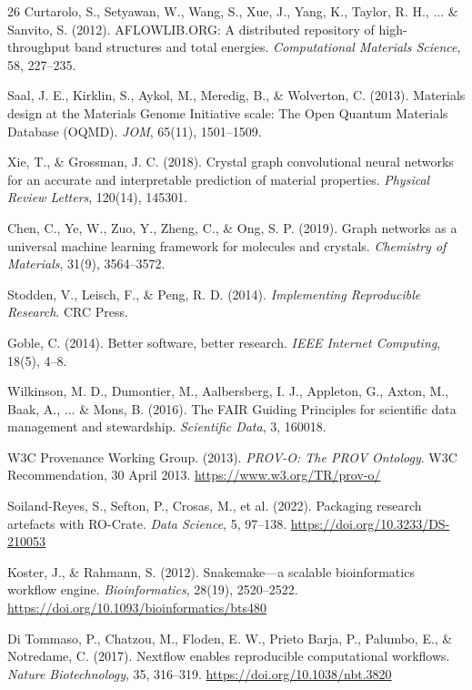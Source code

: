 \documentclass[11pt,a4paper,oneside]{report}
\begin{document}
\begin{thebibliography}{26}
Curtarolo, S., Setyawan, W., Wang, S., Xue, J., Yang, K., Taylor, R. H., ... \& Sanvito, S. (2012). AFLOWLIB.ORG: A distributed repository of high-throughput band structures and total energies. \emph{Computational Materials Science}, 58, 227--235.

Saal, J. E., Kirklin, S., Aykol, M., Meredig, B., \& Wolverton, C. (2013). Materials design at the Materials Genome Initiative scale: The Open Quantum Materials Database (OQMD). \emph{JOM}, 65(11), 1501--1509.

Xie, T., \& Grossman, J. C. (2018). Crystal graph convolutional neural networks for an accurate and interpretable prediction of material properties. \emph{Physical Review Letters}, 120(14), 145301.

Chen, C., Ye, W., Zuo, Y., Zheng, C., \& Ong, S. P. (2019). Graph networks as a universal machine learning framework for molecules and crystals. \emph{Chemistry of Materials}, 31(9), 3564--3572.

Stodden, V., Leisch, F., \& Peng, R. D. (2014). \emph{Implementing Reproducible Research}. CRC Press.

Goble, C. (2014). Better software, better research. \emph{IEEE Internet Computing}, 18(5), 4--8.

Wilkinson, M. D., Dumontier, M., Aalbersberg, I. J., Appleton, G., Axton, M., Baak, A., ... \& Mons, B. (2016). The FAIR Guiding Principles for scientific data management and stewardship. \emph{Scientific Data}, 3, 160018.

W3C Provenance Working Group. (2013). \emph{PROV-O: The PROV Ontology}. W3C Recommendation, 30 April 2013. \url{https://www.w3.org/TR/prov-o/}

Soiland-Reyes, S., Sefton, P., Crosas, M., et al. (2022). Packaging research artefacts with RO-Crate. \emph{Data Science}, 5, 97--138. \url{https://doi.org/10.3233/DS-210053}

Koster, J., \& Rahmann, S. (2012). Snakemake---a scalable bioinformatics workflow engine. \emph{Bioinformatics}, 28(19), 2520--2522. \url{https://doi.org/10.1093/bioinformatics/bts480}

Di Tommaso, P., Chatzou, M., Floden, E. W., Prieto Barja, P., Palumbo, E., \& Notredame, C. (2017). Nextflow enables reproducible computational workflows. \emph{Nature Biotechnology}, 35, 316--319. \url{https://doi.org/10.1038/nbt.3820}


\end{thebibliography}
\end{document}
